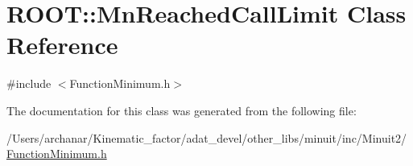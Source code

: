 \hypertarget{classROOT_1_1Minuit2_1_1FunctionMinimum_1_1MnReachedCallLimit}{}\section{R\+O\+OT\+:\+:Mn\+Reached\+Call\+Limit Class Reference}
\label{classROOT_1_1Minuit2_1_1FunctionMinimum_1_1MnReachedCallLimit}


{\ttfamily \#include $<$Function\+Minimum.\+h$>$}



The documentation for this class was generated from the following file\+:\begin{DoxyCompactItemize}
\item 
/\+Users/archanar/\+Kinematic\+\_\+factor/adat\+\_\+devel/other\+\_\+libs/minuit/inc/\+Minuit2/\mbox{\hyperlink{other__libs_2minuit_2inc_2Minuit2_2FunctionMinimum_8h}{Function\+Minimum.\+h}}\end{DoxyCompactItemize}
